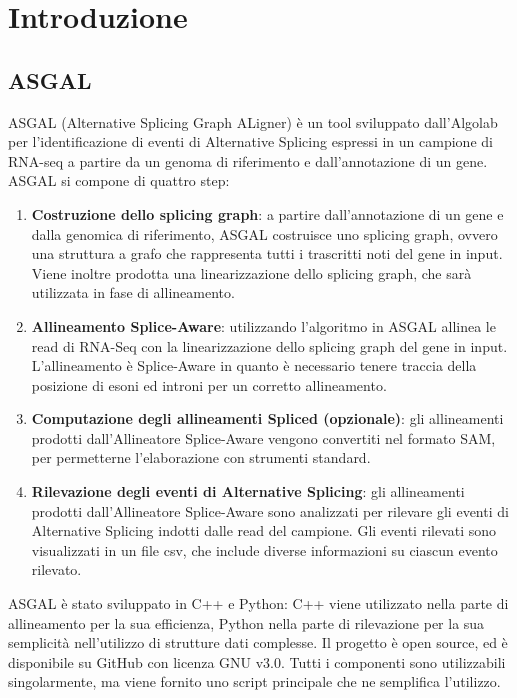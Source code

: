 \section{Introduzione}

\subsection{ASGAL}
ASGAL (Alternative Splicing Graph ALigner) \cite{ASGAL} è un tool sviluppato dall'Algolab per l'identificazione di eventi di Alternative Splicing espressi in un campione di RNA-seq a partire da un genoma di riferimento e dall'annotazione di un gene. ASGAL si compone di quattro step:

\begin{enumerate}
	\item \textbf{Costruzione dello splicing graph}: a partire dall'annotazione di un gene e dalla genomica di riferimento, ASGAL costruisce uno splicing graph, ovvero una struttura a grafo che rappresenta tutti i trascritti noti del gene in input. Viene inoltre prodotta una linearizzazione dello splicing graph, che sarà utilizzata in fase di allineamento.
	\item \textbf{Allineamento Splice-Aware}: utilizzando l'algoritmo in \cite{MEM} ASGAL allinea le read di RNA-Seq con la linearizzazione dello splicing graph del gene in input. L'allineamento è Splice-Aware in quanto è necessario tenere traccia della posizione di esoni ed introni per un corretto allineamento.
	\item \textbf{Computazione degli allineamenti Spliced (opzionale)}: gli allineamenti prodotti dall'Allineatore Splice-Aware vengono convertiti nel formato SAM, per permetterne l'elaborazione con strumenti standard.
	\item \textbf{Rilevazione degli eventi di Alternative Splicing}: gli allineamenti prodotti dall'Allineatore Splice-Aware sono analizzati per rilevare gli eventi di Alternative Splicing indotti dalle read del campione. Gli eventi rilevati sono visualizzati in un file csv, che include diverse informazioni su ciascun evento rilevato.
\end{enumerate}

ASGAL è stato sviluppato in C++ e Python: C++ viene utilizzato nella parte di allineamento per la sua efficienza, Python nella parte di rilevazione per la sua semplicità nell'utilizzo di strutture dati complesse. Il progetto è open source, ed è disponibile su GitHub con licenza GNU v3.0. Tutti i componenti sono utilizzabili singolarmente, ma viene fornito uno script principale che ne semplifica l'utilizzo.  


